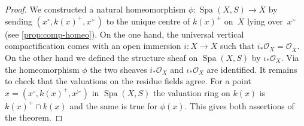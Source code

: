 \documentclass[a4paper,twoside,11pt,reqno]{amsart}
\newcommand{\cO}{{\mathcal O}}
\DeclareMathOperator{\Spa}{Spa}
\newcommand{\ov}[1]{\overline{#1}}
\theoremstyle{definition}
\numberwithin{equation}{subsection}
\begin{document}
\begin{proof}
    We constructed a natural homeomorphism $\phi \colon \Spa(X,S) \to \ov X$ by sending $(x^\circ,k(x)^+,x^\succ)$ to the unique centre of $k(x)^+$ on~$\ov X$ lying over~$x^\succ$ (see \cref{prop:comp-homeo}).
    On the one hand, the universal vertical compactification comes with an open immersion $i \colon X \to \overline{X}$ such that $i_*\cO_X = \cO_{\overline{X}}$.
    On the other hand we defined the structure sheaf on $\Spa(X,S)$ by $\iota_*\cO_X$.
    Via the homeomorphism $\phi$ the two sheaves $i_*\cO_X$ and $\iota_*\cO_X$ are identified.
    It remains to check that the valuations on the residue fields agree.
    For a point $x = (x^\circ,k(x)^+,x^\succ)$ in $\Spa(X,S)$ the valuation ring on $k(x)$ is $k(x)^+ \cap k(x)$ and the same is true for $\phi(x)$.
    This gives both assertions of the theorem.
\end{proof}
\end{document}
